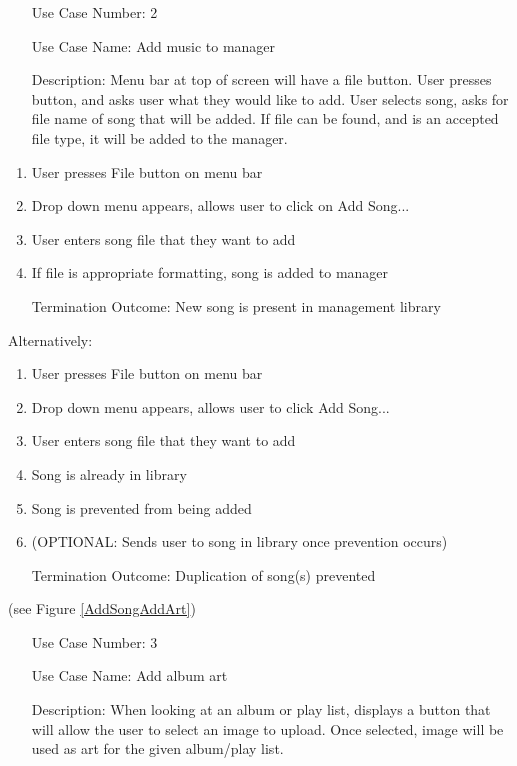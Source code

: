 \documentclass[10pt,conference,onecolumn,compsoc]{IEEEtran}
\begin{document}
\begin{itemize}
\item[Use Case Number:] 2
\item[Use Case Name:] Add music to manager
\item[Description:] Menu bar at top of screen will have a file button. User presses button, and asks user what they would like to add. User selects song, asks for file name of song that will be added. If file can be found, and is an accepted file type, it will be added to the manager.
\end{itemize}

\begin{enumerate}
\item User presses File button on menu bar
\item Drop down menu appears, allows user to click on Add Song...
\item User enters song file that they want to add
\item If file is appropriate formatting, song is added to manager
\item [Termination Outcome:] New song is present in management library
\end{enumerate}

Alternatively:
\begin{enumerate}
\item User presses File button on menu bar
\item Drop down menu appears, allows user to click Add Song...
\item User enters song file that they want to add
\item Song is already in library
\item Song is prevented from being added
\item (OPTIONAL: Sends user to song in library once prevention occurs)
\item [Termination Outcome:] Duplication of song(s) prevented
\end{enumerate}

(see Figure \ref{AddSongAddArt})

\begin{itemize}
\item[Use Case Number:] 3
\item[Use Case Name:] Add album art
\item[Description:] When looking at an album or play list, displays a button that will allow the user to select an image to upload. Once selected, image will be used as art for the given album/play list.
\end{itemize}
\end{document}
